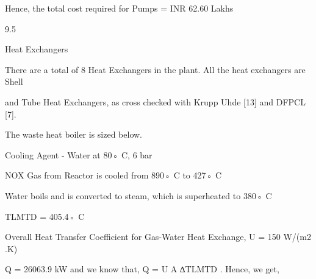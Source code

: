 \documentclass[a4paper,portrait,12pt]{article}
\begin{document}
\begin{flushleft}
Hence, the total cost required for Pumps = INR 62.60 Lakhs
\end{flushleft}





9.5





\begin{flushleft}
Heat Exchangers
\end{flushleft}





\begin{flushleft}
There are a total of 8 Heat Exchangers in the plant. All the heat exchangers are Shell
\end{flushleft}


\begin{flushleft}
and Tube Heat Exchangers, as cross checked with Krupp Uhde [13] and DFPCL [7].
\end{flushleft}


\begin{flushleft}
The waste heat boiler is sized below.
\end{flushleft}


\begin{flushleft}
Cooling Agent - Water at 80◦ C, 6 bar
\end{flushleft}


\begin{flushleft}
NOX Gas from Reactor is cooled from 890◦ C to 427◦ C
\end{flushleft}


\begin{flushleft}
Water boils and is converted to steam, which is superheated to 380◦ C
\end{flushleft}


\begin{flushleft}
TLMTD = 405.4◦ C
\end{flushleft}


\begin{flushleft}
Overall Heat Transfer Coefficient for Gas-Water Heat Exchange, U = 150 W/(m2 .K)
\end{flushleft}


\begin{flushleft}
Q = 26063.9 kW and we know that, Q = U A ∆TLMTD . Hence, we get,
\end{flushleft}
\end{document}
